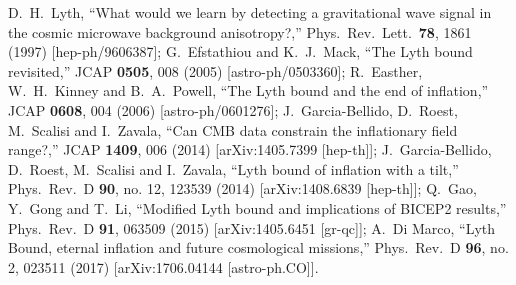 \documentclass[%
aps,prd,nofootinbib,showkeys,a4paper,10pt
]{revtex4-2}
\begin{document}
\begin{thebibliography}{10}
D.~H.~Lyth,
``What would we learn by detecting a gravitational wave signal in the cosmic microwave background anisotropy?,''
Phys.\ Rev.\ Lett.\  {\bf 78}, 1861 (1997)
[hep-ph/9606387];
G.~Efstathiou and K.~J.~Mack,
``The Lyth bound revisited,''
JCAP {\bf 0505}, 008 (2005)
[astro-ph/0503360];
R.~Easther, W.~H.~Kinney and B.~A.~Powell,
``The Lyth bound and the end of inflation,''
JCAP {\bf 0608}, 004 (2006)
[astro-ph/0601276];
J.~Garcia-Bellido, D.~Roest, M.~Scalisi and I.~Zavala,
``Can CMB data constrain the inflationary field range?,''
JCAP {\bf 1409}, 006 (2014)
[arXiv:1405.7399 [hep-th]];
J.~Garcia-Bellido, D.~Roest, M.~Scalisi and I.~Zavala,
``Lyth bound of inflation with a tilt,''
Phys.\ Rev.\ D {\bf 90}, no. 12, 123539 (2014)
[arXiv:1408.6839 [hep-th]];
Q.~Gao, Y.~Gong and T.~Li,
``Modified Lyth bound and implications of BICEP2 results,''
Phys.\ Rev.\ D {\bf 91}, 063509 (2015)
[arXiv:1405.6451 [gr-qc]];
A.~Di Marco,
``Lyth Bound, eternal inflation and future cosmological missions,''
Phys.\ Rev.\ D {\bf 96}, no. 2, 023511 (2017)
[arXiv:1706.04144 [astro-ph.CO]].







\end{thebibliography}
\end{document}
